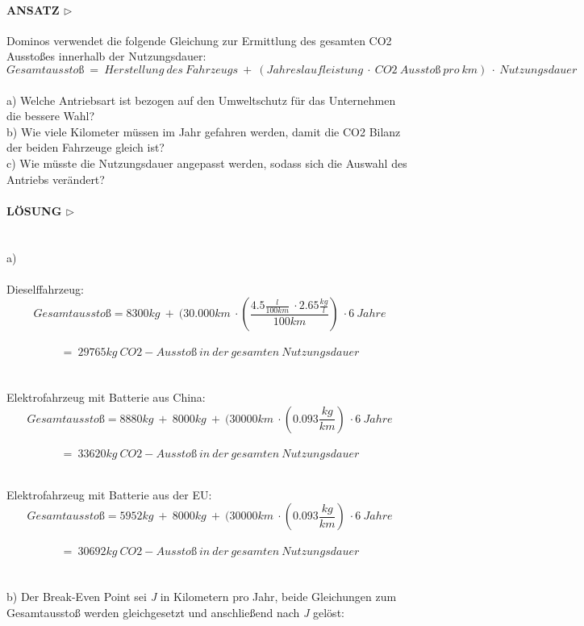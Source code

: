 \documentclass[13pt,titlepage]{article}
\begin{document}
\paragraph{\textbf{ANSATZ} $\triangleright$ }
Dominos verwendet die folgende Gleichung zur Ermittlung des gesamten CO2 Ausstoßes innerhalb der Nutzungsdauer: \\
$$Gesamtausstoß\ =\ Herstellung\ des\ Fahrzeugs\ +\ (Jahreslaufleistung\ \cdot\ CO2\ Ausstoß\ pro\ km)\ \cdot\ Nutzungsdauer$$\\
a) Welche Antriebsart ist bezogen auf den Umweltschutz für das Unternehmen die bessere Wahl?\\
b) Wie viele Kilometer müssen im Jahr gefahren werden, damit die CO2 Bilanz der beiden Fahrzeuge gleich ist?\\
c) Wie müsste die Nutzungsdauer angepasst werden, sodass sich die Auswahl des Antriebs verändert?\\

\paragraph{\textbf{LÖSUNG} $\triangleright$ }\mbox{}\\

a) \\\mbox{}\\
Dieselffahrzeug:\\

$$ Gesamtausstoß = 8300kg\ +\ (30.000km\ \cdot (\frac{4.5\frac{l}{100km}\ \cdot  2.65\frac{kg}{l}}{100km})\ \cdot  6\ Jahre $$\\ $$=\ 29765kg\ CO2-Ausstoß\ in\ der\ gesamten\ Nutzungsdauer$$ \\
\mbox{}
\\
Elektrofahrzeug mit Batterie aus China:\\

$$ Gesamtausstoß = 8880kg\ +\ 8000kg\ +\ (30000km\ \cdot  (0.093\frac{kg}{km})\ \cdot  6\ Jahre $$\\ $$=\ 33620kg\ CO2-Ausstoß\ in\ der\ gesamten\ Nutzungsdauer$$ \\
\mbox{}
\newpage

Elektrofahrzeug mit Batterie aus der EU:\\

$$ Gesamtausstoß = 5952kg\ +\ 8000kg\ +\ (30000km\ \cdot  (0.093\frac{kg}{km})\ \cdot  6\ Jahre $$\\ $$=\ 30692kg\ CO2-Ausstoß\ in\ der\ gesamten\ Nutzungsdauer$$ \\
\mbox{}
\\
b) Der Break-Even Point sei \emph{J} in Kilometern pro Jahr, beide Gleichungen zum Gesamtausstoß werden gleichgesetzt und anschließend nach \emph{J} gel\"ost:\\
\end{document}
